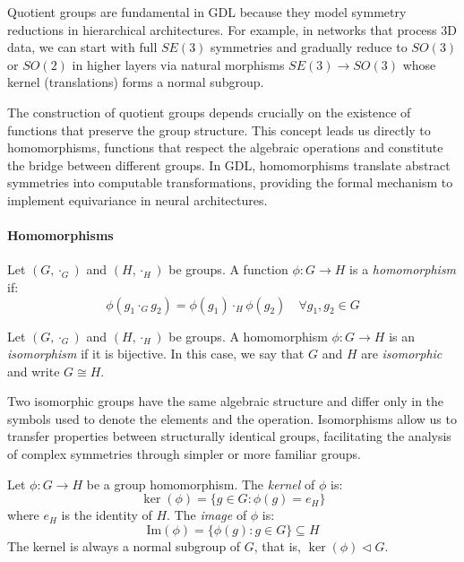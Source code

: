 Quotient groups are fundamental in \gls{GDL} because they model symmetry reductions in hierarchical architectures. For example, in networks that process 3D data, we can start with full $SE(3)$ symmetries and gradually reduce to $SO(3)$ or $SO(2)$ in higher layers via natural morphisms $SE(3) \rightarrow SO(3)$ whose kernel (translations) forms a normal subgroup.

The construction of quotient groups depends crucially on the existence of functions that preserve the group structure. This concept leads us directly to homomorphisms, functions that respect the algebraic operations and constitute the bridge between different groups. In \gls{GDL}, homomorphisms translate abstract symmetries into computable transformations, providing the formal mechanism to implement equivariance in neural architectures.

\paragraph{Homomorphisms}

\begin{definition}\label{def:homomorfismo_grupos}
Let $(G, \cdot_G)$ and $(H, \cdot_H)$ be groups. A function $\phi: G \rightarrow H$ is a \textit{homomorphism} if:
\begin{equation}
\phi(g_1 \cdot_G g_2) = \phi(g_1) \cdot_H \phi(g_2) \quad \forall g_1, g_2 \in G
\end{equation}
\end{definition}

\begin{definition}\label{def:isomorfismo_grupos}
Let $(G, \cdot_G)$ and $(H, \cdot_H)$ be groups. A homomorphism $\phi: G \rightarrow H$ is an \textit{isomorphism} if it is bijective. In this case, we say that $G$ and $H$ are \textit{isomorphic} and write $G \cong H$.
\end{definition}

Two isomorphic groups have the same algebraic structure and differ only in the symbols used to denote the elements and the operation. Isomorphisms allow us to transfer properties between structurally identical groups, facilitating the analysis of complex symmetries through simpler or more familiar groups.

\begin{definition}\label{def:nucleo_imagen}
Let $\phi: G \rightarrow H$ be a group homomorphism. The \textit{kernel} of $\phi$ is:
\begin{equation}
\ker(\phi) = \{g \in G : \phi(g) = e_H\}
\end{equation}
where $e_H$ is the identity of $H$. The \textit{image} of $\phi$ is:
\begin{equation}
\mathrm{Im}(\phi) = \{\phi(g) : g \in G\} \subseteq H
\end{equation}
The kernel is always a normal subgroup of $G$, that is, $\ker(\phi) \triangleleft G$.
\end{definition}

